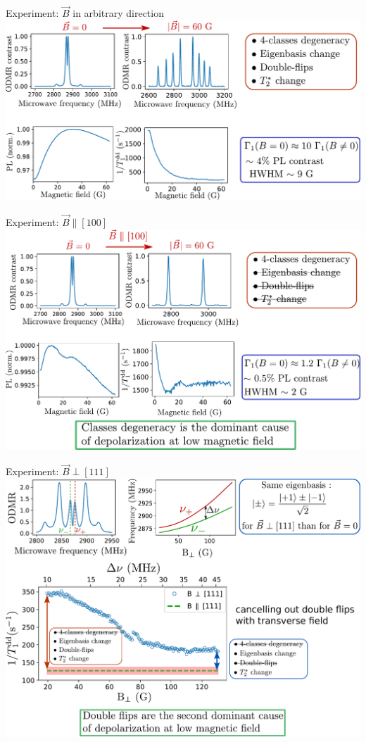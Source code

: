 \documentclass{beamer}
\begin{document}
\begin{frame}{Experiment: $\vec B$ in arbitrary direction}
\centering
\includegraphics[width=\textwidth,height=0.9\textheight,keepaspectratio]{Slide_T1_PL_1x1x1x1}
\end{frame}

\begin{frame}{Experiment: $\vec B \parallel [100]$}
\centering
\includegraphics[width=\textwidth,height=0.9\textheight,keepaspectratio]{Slide_T1_PL_100}
\end{frame}

\begin{frame}{Experiment: $\vec B \perp [111]$}
\centering
\includegraphics[width=\textwidth,height=0.9\textheight,keepaspectratio]{slide_champs_transverse}
\end{frame}
\end{document}
